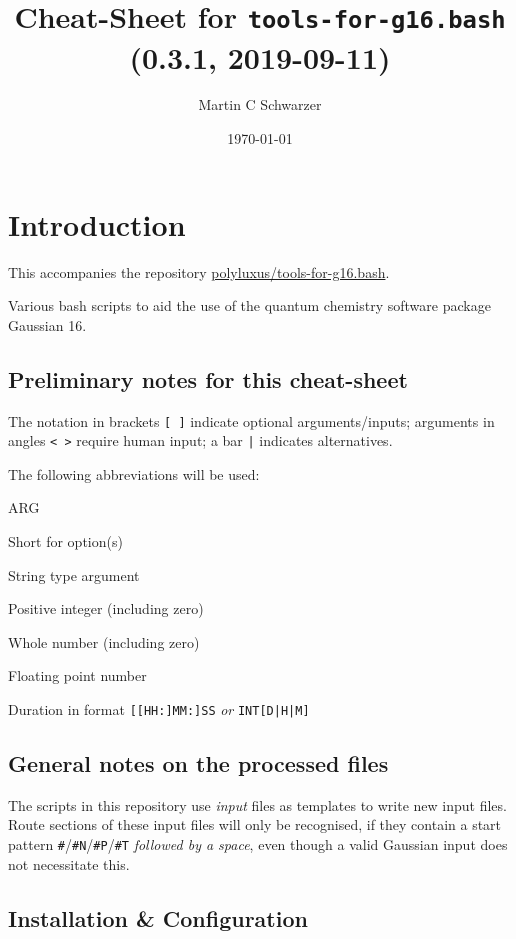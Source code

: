 \documentclass[   %
  final,          %
  a4paper,        %
  rscols=3,       %
  margin=1.0cm,   %
]{refsheet}
\title{Cheat-Sheet for \texttt{tools-for-g16.bash} (0.3.1, 2019-09-11)}
\author{Martin C Schwarzer}
\date{\today}
\begin{document}
\maketitle

\section{Introduction}

This accompanies the repository \href{https://github.com/polyluxus/tools-for-g16.bash}{polyluxus/tools-for-g16.bash}.

Various bash scripts to aid the use of the quantum chemistry software package Gaussian 16.

\subsection{Preliminary notes for this cheat-sheet}

The notation in brackets \texttt{[ ]} indicate optional arguments/inputs;
arguments in angles \texttt{< >} require human input;
a bar \texttt{|} indicates alternatives.

The following abbreviations will be used:
\begin{rslisttt}{ARG}
  \item[opt] Short for option(s)
  \item[ARG] String type argument
  \item[INT] Positive integer (including zero)
  \item[NUM] Whole number (including zero)
  \item[FLT] Floating point number
  \item[DUR] Duration in format \texttt{[[HH:]MM:]SS} \emph{or} \texttt{INT[D|H|M]}
\end{rslisttt}

\subsection{General notes on the processed files}

The scripts in this repository use \emph{input} files as templates to write new input files.
Route sections of these input files will only be recognised, 
if they contain a start pattern \texttt{\#}/\texttt{\#N}/\texttt{\#P}/\texttt{\#T}
\emph{followed by a space}, even though a valid Gaussian input does not necessitate this.

\subsection{Installation \& Configuration}
\end{document}
